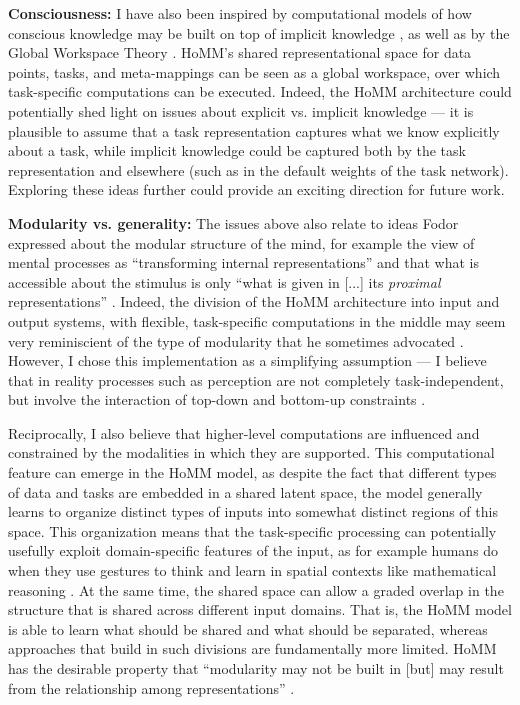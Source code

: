 \textbf{Consciousness:} I have also been inspired by computational models of how conscious knowledge may be built on top of implicit knowledge \citep{Cleeremans2014}, as well as by the Global Workspace Theory \citep{Baars2005}. HoMM's shared representational space for data points, tasks, and meta-mappings can be seen as a global workspace, over which task-specific computations can be executed. Indeed, the HoMM architecture could potentially shed light on issues about explicit vs. implicit knowledge --- it is plausible to assume that a task representation captures what we know explicitly about a task, while implicit knowledge could be captured both by the task representation and elsewhere (such as in the default weights of the task network). Exploring these ideas further could provide an exciting direction for future work. \par

\textbf{Modularity vs. generality:} The issues above also relate to ideas Fodor expressed about the modular structure of the mind, for example the view of mental processes as ``transforming internal representations'' and that what is accessible about the stimulus is only ``what is given in [...] its \emph{proximal} representations'' \citep[][pp. 200-201]{fodor1975language}. Indeed, the division of the HoMM architecture into input and output systems, with flexible, task-specific computations in the middle may seem very reminiscient of the type of modularity that he sometimes advocated \citep{Fodor1983modularity}. However, I chose this implementation as a simplifying assumption --- I believe that in reality processes such as perception are not completely task-independent, but involve the interaction of top-down and bottom-up constraints \citep{McClelland2014}. \par

Reciprocally, I also believe that higher-level computations are influenced and constrained by the modalities in which they are supported. This computational feature can emerge in the HoMM model, as despite the fact that different types of data and tasks are embedded in a shared latent space, the model generally learns to organize distinct types of inputs into somewhat distinct regions of this space. This organization means that the task-specific processing can potentially usefully exploit domain-specific features of the input, as for example humans do when they use gestures to think and learn in spatial contexts like mathematical reasoning \citep{Goldin-Meadow1999, Wakefield2018}. At the same time, the shared space can allow a graded overlap in the structure that is shared across different input domains. That is, the HoMM model is able to learn what should be shared and what should be separated, whereas approaches that build in such divisions are fundamentally more limited. HoMM has the desirable property that ``modularity may not be built in [but] may result from the relationship among representations'' \citep{Tanenhaus1987}.\par

